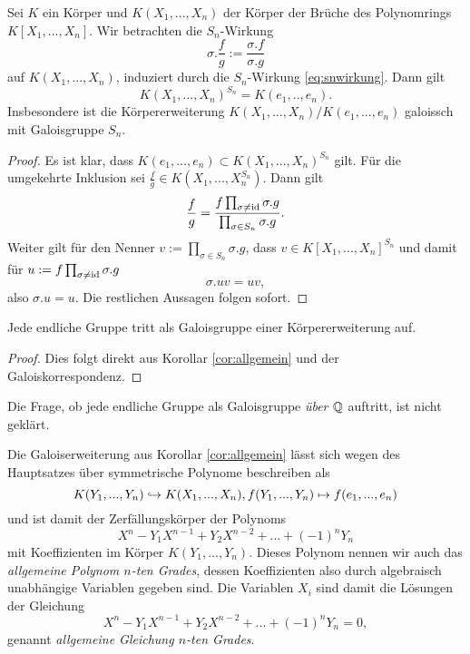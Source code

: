 \documentclass{book}
\begin{document}
\begin{cor}
    \label{cor:allgemein}
    Sei $K$ ein Körper und $K(X_1, ..., X_n)$ der Körper der Brüche des Polynomrings $K[X_1, ..., X_n]$. Wir betrachten die $S_n$-Wirkung
    \[
        \sigma.\frac{f}{g} := \frac{\sigma.f}{\sigma.g} 
    \]
    auf $K(X_1,...,X_n)$, induziert durch die $S_n$-Wirkung \eqref{eq:snwirkung}. Dann gilt
    \[
        K(X_1, ..., X_n)^{S_n} = K(e_1, .., e_n).
    \]
    Insbesondere ist die Körpererweiterung $K(X_1, ..., X_n)/K(e_1, ..., e_n)$
    galoissch mit Galoisgruppe $S_n$. 
\end{cor}
\begin{proof}
    Es ist klar, dass $K(e_1, ..., e_n) \subset K(X_1, ..., X_n)^{S_n}$ gilt.
    Für die umgekehrte Inklusion sei $\frac{f}{g} \in K(X_1, ..., X_n^{S_n})$. Dann gilt
    \[
        \frac{f}{g}  = \frac{f \prod_{\sigma \ne \operatorname{id}} \sigma.g}{\prod_{\sigma \in S_n} \sigma.g} .
    \]
    Weiter gilt für den Nenner $v := \prod_{\sigma \in S_n} \sigma.g$, dass $v \in K[X_1, ..., X_n]^{S_n}$ und damit für $u := f \prod_{\sigma \ne \operatorname{id}} \sigma.g$
    \[
        \sigma.u v = u v,
    \]
    also $\sigma.u = u$. Die restlichen Aussagen folgen sofort. 
\end{proof}

\begin{cor}
    \label{cor:jede_endliche} Jede endliche Gruppe tritt als Galoisgruppe einer Körpererweiterung auf. 
\end{cor}
\begin{proof}
    Dies folgt direkt aus Korollar \ref{cor:allgemein} und der Galoiskorrespondenz.
\end{proof}

\begin{rem}
    \label{rem:galoisq}
    Die Frage, ob jede endliche Gruppe als Galoisgruppe {\em über $\mathbb{Q}$} auftritt, ist nicht geklärt. 
\end{rem}


\begin{rem}
    \label{rem:allgemein}
    Die Galoiserweiterung aus Korollar \ref{cor:allgemein} lässt sich wegen des
    Hauptsatzes über symmetrische Polynome beschreiben als
    \[
        K(Y_1, ..., Y_n) \hookrightarrow K(X_1, ..., X_n), f(Y_1, ..., Y_n) \mapsto f(e_1, ..., e_n)
    \]
    und ist damit der Zerfällungskörper der Polynoms
    \[
        X^n - Y_1 X^{n-1} + Y_2 X^{n-2} + ... + (-1)^n Y_n
    \]
    mit Koeffizienten im Körper $K(Y_1, ..., Y_n)$. Dieses Polynom nennen wir
    auch das {\em allgemeine Polynom $n$-ten Grades}, dessen Koeffizienten also durch 
    algebraisch unabhängige Variablen gegeben sind. Die Variablen $X_i$ sind damit die Lösungen der Gleichung
    \[
        X^n - Y_1 X^{n-1} + Y_2 X^{n-2} + ... + (-1)^n Y_n = 0, 
    \]
    genannt {\em allgemeine Gleichung $n$-ten Grades}. 
\end{rem}
\end{document}
